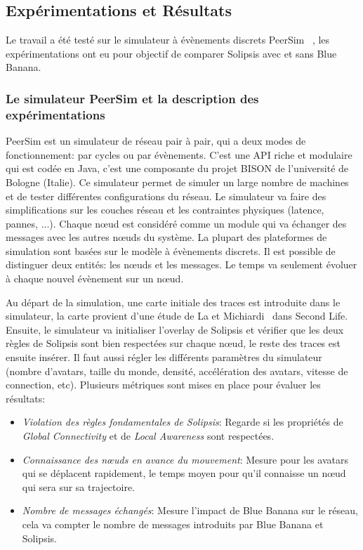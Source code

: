 	\subsection{Expérimentations et Résultats}
		Le travail a été testé sur le simulateur à évènements discrets PeerSim ~\cite{peersim}, les expérimentations ont eu pour objectif de comparer Solipsis avec et sans Blue Banana.
		\subsubsection{Le simulateur PeerSim et la description des expérimentations}
		\par PeerSim est un simulateur de réseau pair à pair, qui a deux modes de fonctionnement: par cycles ou par évènements. C'est une API riche et modulaire qui est codée en Java, c'est une composante du projet BISON de l'université de Bologne (Italie). Ce simulateur permet de simuler un large nombre de machines et de tester différentes configurations du réseau. Le simulateur va faire des simplifications sur les couches réseau et les contraintes physiques (latence, pannes, ...). Chaque nœud est considéré comme un module qui va échanger des messages avec les autres nœuds du système. La plupart des plateformes de simulation sont basées sur le modèle à évènements discrets. Il est possible de distinguer deux entités: les nœuds et les messages. Le temps va seulement évoluer à chaque nouvel évènement sur un nœud.
		\par Au départ de la simulation, une carte initiale des traces est introduite dans le simulateur, la carte provient d'une étude de La et Michiardi~\cite{LM-wosn08} dans Second Life. Ensuite, le simulateur va initialiser l'overlay de Solipsis et vérifier que les deux règles de Solipsis sont bien respectées sur chaque nœud, le reste des traces est ensuite insérer. Il faut aussi régler les différents paramètres du simulateur (nombre d'avatars, taille du monde, densité, accélération des avatars, vitesse de connection, etc). Plusieurs métriques sont mises en place pour évaluer les résultats:
	\begin{itemize}
	\renewcommand{\labelitemi}{$\bullet$}
		\item \textit{Violation des règles fondamentales de  Solipsis}: Regarde si les propriétés de \textit{Global Connectivity} et de \textit{Local Awareness} sont respectées.
		\item \textit{Connaissance des nœuds en avance du mouvement}: Mesure pour les avatars qui se déplacent rapidement, le temps moyen pour qu'il connaisse un nœud qui sera sur sa trajectoire.
		\item \textit{Nombre de messages échangés}: Mesure l'impact de Blue Banana sur le réseau, cela va compter le nombre de messages introduits par Blue Banana et Solipsis.
	\end{itemize}
